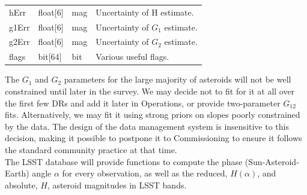 \documentclass[12pt]{article}
\begin{document}
\begin{center}
\begin{longtable}{p{3cm}p{2cm}p{2cm}p{5cm}}
hErr & float[6] & mag & Uncertainty of H estimate.\\

g1Err & float[6] & mag & Uncertainty of $G_1$ estimate. \\

g2Err & float[6] & mag & Uncertainty of $G_2$ estimate. \\

flags & bit[64] & bit & Various useful flags. \\ \hline

\end{longtable}
\end{center}

The $G_1$ and $G_2$ parameters for the large majority of asteroids will not be well constrained until later in the survey. We may decide not to fit for it at all over the first few DRs and add it later in Operations, or provide two-parameter $G_{12}$ fits. Alternatively, we may fit it using strong priors on slopes poorly constrained by the data. The design of the data management system is insensitive to this decision, making it possible to postpone it to Commissioning to ensure it follows the standard community practice at that time.
\\

The LSST database will provide functions to compute the phase (Sun-Asteroid-Earth) angle $\alpha$ for every observation, as well as the reduced, $H(\alpha)$, and absolute, $H$, asteroid magnitudes in LSST bands.
\end{document}
